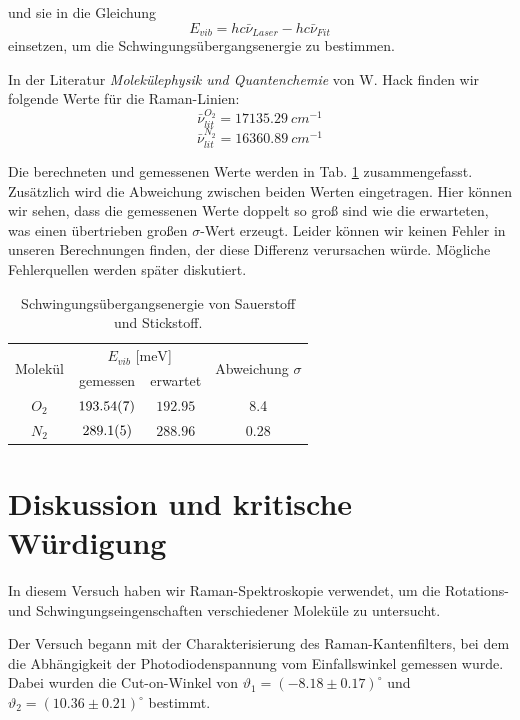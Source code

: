 \documentclass[11pt]{article}
\begin{document}
und sie in die Gleichung
\begin{equation}
E_{vib} = hc\bar{\nu}_{Laser} - hc\bar{\nu}_{Fit}
\end{equation}
einsetzen, um die Schwingungsübergangsenergie zu bestimmen.

In der Literatur \textit{Molekülephysik und Quantenchemie} von W. Hack finden wir folgende Werte für die Raman-Linien:
$$\bar{\nu}^{O_2}_{lit} = \SI{17135.29}{cm^{-1}}$$
$$\bar{\nu}^{N_2}_{lit} = \SI{16360.89}{cm^{-1}}$$

Die berechneten und gemessenen Werte werden in Tab. \ref{tab:N_O} zusammengefasst. Zusätzlich wird die Abweichung zwischen beiden Werten eingetragen. Hier können wir sehen, dass die gemessenen Werte doppelt so groß sind wie die erwarteten, was einen übertrieben großen $\sigma$-Wert erzeugt. Leider können wir keinen Fehler in unseren Berechnungen finden, der diese Differenz verursachen würde. Mögliche Fehlerquellen werden später diskutiert.

\begin{table}[!htbp]
 \begin{center}
  \caption{ \small Schwingungsübergangsenergie von Sauerstoff und Stickstoff.}
  \label{tab:N_O}
  \renewcommand{\arraystretch}{1.3}
  \begin{tabular}{|c|c|c|c|}
  \hline

\multirow{2}{*}{Molekül}& \multicolumn{2}{c|}{$E_{vib}$ [$\unit{\milli\electronvolt}$]} &  \multirow{2}{*}{ Abweichung $\sigma$} \\ \cline{2-3} %
 					 & gemessen & erwartet &    			\\
  \hline
  \hline
  $O_2$	&	$\num{193.54 \pm 0.07}$	&	$\num{192.95}$ &	8.4\\
  $N_2$	&	$\num{289.1 \pm 0.5}$	&	$\num{288.96}$&	0.28\\ 
  \hline
  \end{tabular}
  \renewcommand{\arraystretch}{1}
 \end{center}
\end{table}

\section{Diskussion und kritische Würdigung}
In diesem Versuch haben wir Raman-Spektroskopie verwendet, um die Rotations- und Schwingungseingenschaften verschiedener Moleküle zu untersucht.

Der Versuch begann mit der Charakterisierung des Raman-Kantenfilters, bei dem die Abhängigkeit der Photodiodenspannung vom Einfallswinkel gemessen wurde. Dabei wurden die Cut-on-Winkel von $\vartheta_1 = \left(-8.18\pm 0.17\right)^\circ$ und $\vartheta_2 =\left(10.36\pm 0.21\right)^\circ$ bestimmt. 
\end{document}

